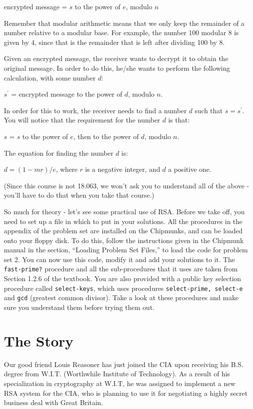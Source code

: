 \centerline{encrypted message = $s$ to the power of $e$, modulo $n$}

Remember that modular arithmetic means that we only keep the remainder
of a number relative to a modular base.  For example, the number 100
modular 8 is given by 4, since that is the remainder that is left after
dividing 100 by 8.

Given an encrypted message, the receiver wants to decrypt it to obtain
the original message.  In order to do this, he/she wants to
perform the following calculation, with some number $d$:

\centerline{$s^\prime$ = encrypted message to the power of $d$, modulo
$n$.} 

In order for this to work, the receiver needs to find a number $d$ such
that $s = s^\prime$.  You will notice that the requirement for the
number $d$ is that:   

\centerline{$s$ = $s$ to the power of $e$, then to the power of $d$, modulo
$n$.} 

The equation for finding the number $d$ is:

\centerline{$d = (1 - mr)/e$, where $r$ is a negative integer, and $d$ a positive one.}

(Since this course is not 18.063, we won't ask you to understand all of the
above - you'll have to do that when you take that course.)

So much for theory - let's see some practical use of RSA.  Before we take
off, you need to set up a file in which to put in your solutions.  All the
procedures in the appendix of the problem set are installed on the
Chipmunks, and can be loaded onto your floppy disk.  To do this,
follow the instructions given in the Chipmunk manual in the section,
``Loading Problem Set Files,'' to load the code for problem set 2.
You can now use this code, modify it and add your solutions to it.
The {\tt fast-prime?} procedure and all the sub-procedures that it uses
are 
taken from Section 1.2.6 of the textbook. You are also provided with a
public key selection procedure called {\tt select-keys}, which uses
procedures
{\tt select-prime, select-e} and {\tt gcd} (greatest common divisor). 
Take a look at
these procedures and make sure you understand them before trying them out.

\section{The Story}

Our good friend Louis Reasoner has just joined the CIA upon receiving his
B.S. degree from W.I.T. (Worthwhile Institute of Technology).  As a result of
his specialization in cryptography at W.I.T, he was assigned to implement a
new RSA system for the CIA, who is planning to use it for negotiating a
highly secret business deal with Great Britain.

